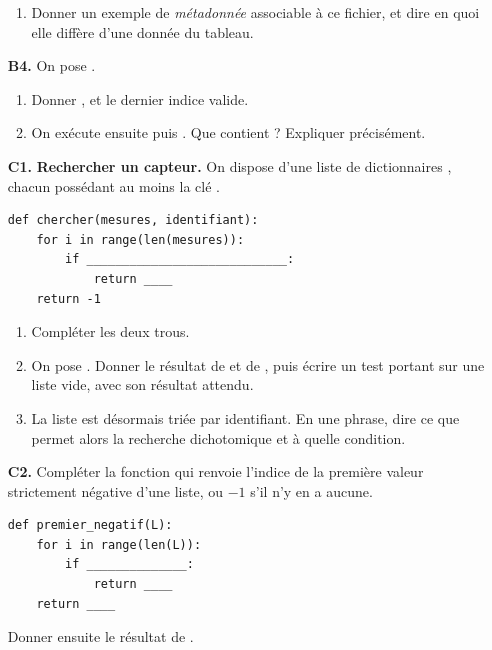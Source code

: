 \documentclass[10pt,a4paper]{article}
\begin{document}
\begin{enumerate}
\begin{enumerate}
\item Donner un exemple de \emph{métadonnée} associable à ce fichier, et dire en quoi elle
diffère d'une donnée du tableau.
\end{enumerate}
\par\vspace{1.2mm}
\needspace{22mm}
\item[\textbf{B4.}] On pose .
\begin{enumerate}
\item Donner ,  et le dernier indice valide.
\item On exécute ensuite  puis . Que contient  ? Expliquer précisément.
\end{enumerate}
\par\vspace{1.2mm}
\end{enumerate}
\needspace{68mm}\par\vspace{3mm}
\begin{enumerate}
\needspace{22mm}
\item[\textbf{C1.}] \textbf{Rechercher un capteur.} On dispose d'une liste de dictionnaires
, chacun possédant au moins la clé .
\begin{lstlisting}
def chercher(mesures, identifiant):
    for i in range(len(mesures)):
        if ____________________________:
            return ____
    return -1
\end{lstlisting}
\begin{enumerate}
\item Compléter les deux trous.
\item On pose . Donner le résultat de
 et de , puis écrire un test portant sur
une liste vide, avec son résultat attendu.
\item La liste est désormais triée par identifiant. En une phrase, dire ce que permet alors la recherche
dichotomique et à quelle condition.
\end{enumerate}
\par\vspace{1.2mm}
\needspace{22mm}
\item[\textbf{C2.}] Compléter la fonction qui renvoie l'indice de la première valeur strictement négative
d'une liste, ou $-1$ s'il n'y en a aucune.
\begin{lstlisting}
def premier_negatif(L):
    for i in range(len(L)):
        if ______________:
            return ____
    return ____
\end{lstlisting}
Donner ensuite le résultat de .
\par\vspace{1.2mm}
\end{enumerate}
\end{document}

